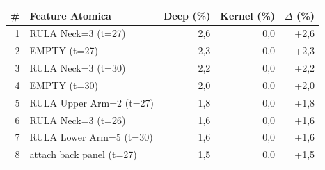 \begin{tabular*}{\linewidth}{@{}r@{\extracolsep{\fill}}lrrr@{}}
\toprule
\textbf{\#} & \textbf{Feature Atomica} & \textbf{Deep (\%)} & \textbf{Kernel (\%)} & \textbf{$\Delta$ (\%)} \\
\midrule
1 & RULA Neck=3 (t=27) & 2{,}6 & 0{,}0 & +2{,}6 \\
2 & EMPTY (t=27) & 2{,}3 & 0{,}0 & +2{,}3 \\
3 & RULA Neck=3 (t=30) & 2{,}2 & 0{,}0 & +2{,}2 \\
4 & EMPTY (t=30) & 2{,}0 & 0{,}0 & +2{,}0 \\
5 & RULA Upper Arm=2 (t=27) & 1{,}8 & 0{,}0 & +1{,}8 \\
6 & RULA Neck=3 (t=26) & 1{,}6 & 0{,}0 & +1{,}6 \\
7 & RULA Lower Arm=5 (t=30) & 1{,}6 & 0{,}0 & +1{,}6 \\
8 & attach back panel (t=27) & 1{,}5 & 0{,}0 & +1{,}5 \\
\bottomrule
\end{tabular*}
